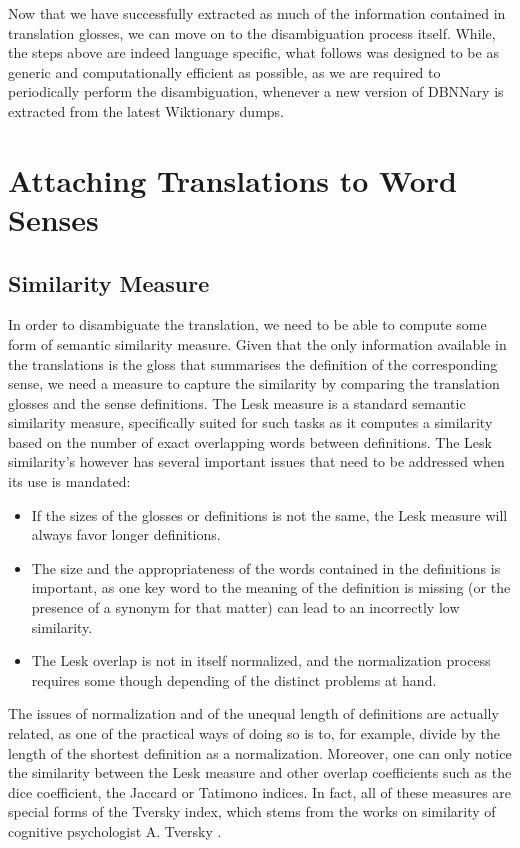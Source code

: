\documentclass[10pt, a4paper]{article}
\begin{document}
Now that we have successfully extracted as much of the information contained in translation glosses, we can move on to the disambiguation process itself. While, the steps above are indeed language specific, what follows was designed to be as generic and computationally efficient as possible, as we are required to periodically perform the disambiguation, whenever a new version of DBNNary is extracted from the latest Wiktionary dumps.

\section{Attaching Translations to Word Senses}
\subsection{Similarity Measure}
In order to disambiguate the translation, we need to be able to compute some form of semantic similarity measure. Given that the only information available in the translations is the gloss that summarises the definition of the corresponding sense, we need a measure to capture the similarity by comparing the translation glosses and the sense definitions. The Lesk \cite{citeulike:625530} measure is a standard semantic similarity measure, specifically suited for such tasks as it computes a similarity based on the number of exact overlapping words between definitions. The Lesk similarity's however has several important issues that need to be addressed when its use is mandated: 
\begin{itemize}
	\item If the sizes of the glosses or definitions is not the same, the Lesk measure will always favor longer definitions.
	\item The size and the appropriateness of the words contained in the definitions is important, as one key word to the meaning of the definition is missing (or the presence of a synonym for that matter) can lead to an incorrectly low similarity.
	\item The Lesk overlap is not in itself normalized, and the normalization process requires some though depending of the distinct problems at hand.
\end{itemize}
 
 The issues of normalization and of the unequal length of definitions are actually related, as one of the practical ways of doing so is to, for example, divide by the length of the shortest definition as a normalization. Moreover, one can only notice the similarity between the Lesk measure and other overlap coefficients such as the dice coefficient, the Jaccard or Tatimono indices. In fact, all of these measures are special forms of the Tversky index, which stems from the works on similarity of cognitive psychologist A. Tversky \cite{tversky77similarity}.
\end{document}
